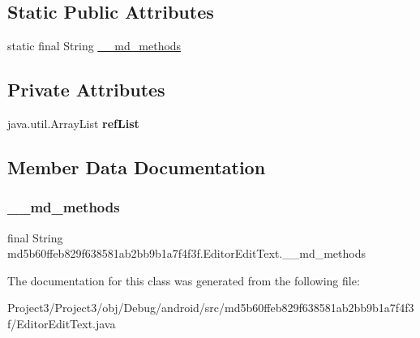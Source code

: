 \subsection*{Static Public Attributes}
\begin{DoxyCompactItemize}
\item 
static final String \hyperlink{classmd5b60ffeb829f638581ab2bb9b1a7f4f3f_1_1EditorEditText_ac38db1db19f69806cc1b75f1a04cebda}{\+\_\+\+\_\+md\+\_\+methods}
\end{DoxyCompactItemize}
\subsection*{Private Attributes}
\begin{DoxyCompactItemize}
\item 
\mbox{\label{classmd5b60ffeb829f638581ab2bb9b1a7f4f3f_1_1EditorEditText_ac9c34d4a7a109014d9c3e0fcb9d24cd4}} 
java.\+util.\+Array\+List {\bfseries ref\+List}
\end{DoxyCompactItemize}


\subsection{Member Data Documentation}
\mbox{\label{classmd5b60ffeb829f638581ab2bb9b1a7f4f3f_1_1EditorEditText_ac38db1db19f69806cc1b75f1a04cebda}} 
\subsubsection{\texorpdfstring{\+\_\+\+\_\+md\+\_\+methods}{\_\_md\_methods}}
{\footnotesize\ttfamily final String md5b60ffeb829f638581ab2bb9b1a7f4f3f.\+Editor\+Edit\+Text.\+\_\+\+\_\+md\+\_\+methods\hspace{0.3cm}{\ttfamily [static]}}



The documentation for this class was generated from the following file\+:\begin{DoxyCompactItemize}
\item 
Project3/\+Project3/obj/\+Debug/android/src/md5b60ffeb829f638581ab2bb9b1a7f4f3f/Editor\+Edit\+Text.\+java\end{DoxyCompactItemize}
